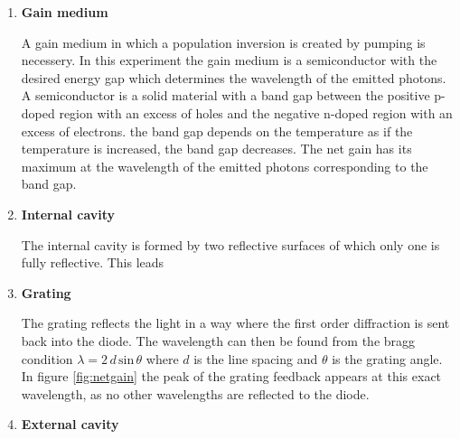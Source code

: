 \begin{enumerate}
\item \textbf{Gain medium}

\noindent
A gain medium in which a population inversion is created by pumping is necessery.
In this experiment the gain medium is a semiconductor with the desired energy gap which determines the wavelength of the emitted photons.
A semiconductor is a solid material with a band gap between the positive p-doped region with an excess of holes and the negative n-doped region with an excess of electrons.
the band gap depends on the temperature as if the temperature is increased, the band gap decreases.
The net gain has its maximum at the wavelength of the emitted photons corresponding to the band gap.

\item \textbf{Internal cavity}

\noindent
The internal cavity is formed by two reflective surfaces of which only one is fully reflective.
This leads 

\item \textbf{Grating}

\noindent
The grating reflects the light in a way where the first order diffraction is sent back into the diode.
The wavelength can then be found from the bragg condition $\lambda = 2 \, d \, \text{sin}\, \theta$ where $d$ is the line spacing and $\theta$ is the grating angle.
In figure \ref{fig:netgain} the peak of the grating feedback appears at this exact wavelength, as no other wavelengths are reflected to the diode.

\item \textbf{External cavity}

\noindent


\end{enumerate}

\noindent
